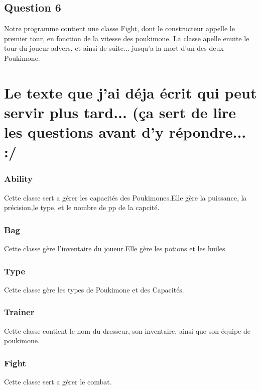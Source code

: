 \documentclass{report}
\begin{document}
\section*{Question 6}
Notre programme contient une classe Fight, dont le constructeur appelle le premier tour, en fonction de la vitesse des poukimone. La classe apelle enuite le tour du joueur advers, et ainsi de suite... jusqu'a la mort d'un des deux Poukimone.

\chapter*{Le texte que j'ai déja écrit qui peut servir plus tard... (ça sert de lire les questions avant d'y répondre... :/}
\subsection*{Ability}
Cette classe sert a gérer les capacités des Poukimones.Elle gère la puissance, la précision,le type, et le nombre de pp de la capcité.
\subsection*{Bag}
Cette classe gère l'inventaire du joueur.Elle gère les potions et les huiles.
\subsection*{Type}
Cette classe gère les types de Poukimone et des Capacités.
\subsection*{Trainer}
Cette classe contient le nom du dresseur, son inventaire, ainsi que son équipe de poukimone.
\subsection*{Fight}
Cette classe sert a gérer le combat.\\
\end{document}
